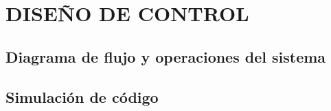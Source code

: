 \chapter{\MakeUppercase{Diseño de Control}} \label{co_design}
\thispagestyle{mainmatterstyle} %
\section{Diagrama de flujo y operaciones del sistema}
\section{Simulación de código}
